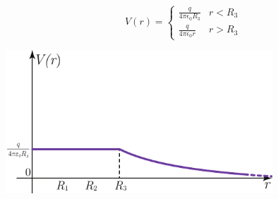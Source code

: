 \begin{equation*}
	V(r)=\begin{cases}
		\frac{q}{4\pi\epsilon_0R_3} & r<R_3\\
		\frac{q}{4\pi\epsilon_0r} & r>R_3
	\end{cases}
\end{equation*}
\begin{center}
	\includegraphics[width=0.75\textwidth]{images/chp4sferacava3graf2.pdf}
\end{center}
